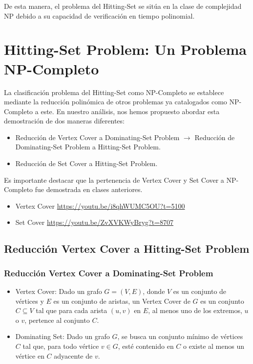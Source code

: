 De esta manera, el problema del Hitting-Set se sitúa en la clase de complejidad NP debido a su capacidad de verificación en tiempo polinomial. 

\section{Hitting-Set Problem: Un Problema NP-Completo}

La clasificación problema del Hitting-Set como NP-Completo se establece mediante la reducción polinómica de otros problemas ya catalogados como NP-Completo a este. En nuestro análisis, nos hemos propuesto abordar esta demostración de dos maneras diferentes:

\begin{itemize}
    \item Reducción de Vertex Cover a Dominating-Set Problem $\rightarrow$ Reducción de Dominating-Set Problem a Hitting-Set Problem.
    \item Reducción de Set Cover a Hitting-Set Problem.
\end{itemize}


Es importante destacar que la pertenencia de Vertex Cover y Set Cover a NP-Completo fue demostrada en clases anteriores.
\begin{itemize}
    \item  Vertex Cover \url{https://youtu.be/i8qhWUMC5OU?t=5100}
    \item Set Cover \url{https://youtu.be/ZvXVKWyBryg?t=8707}
\end{itemize}

\subsection{Reducción Vertex Cover a Hitting-Set Problem}

\subsubsection{Reducción Vertex Cover a Dominating-Set Problem}

\begin{itemize}
    \item Vertex Cover: Dado un grafo $G=(V,E)$, donde $V$ es un conjunto de vértices y $E$ es un conjunto de aristas, un Vertex Cover de $G$ es un conjunto $C \subseteq V$ tal que para cada arista $(u,v)$ en $E$, al menos uno de los extremos, $u$ o $v$, pertence al conjunto $C$.  
    \item Dominating Set: Dado un grafo $G$, se busca un conjunto mínimo de vértices $C$
    tal que, para todo vértice $v \in G$, esté contenido en $C$ o existe al menos un vértice en $C$ adyacente de $v$.
\end{itemize}

